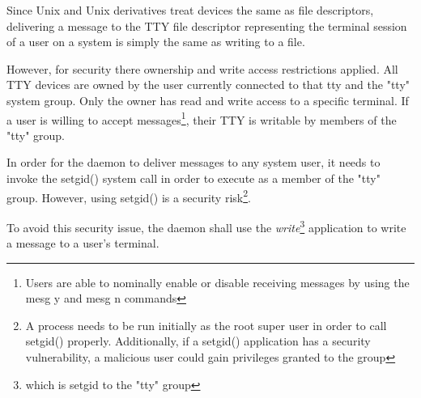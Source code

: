 
Since Unix and Unix derivatives treat devices the same as file
descriptors, delivering a message to the TTY file descriptor 
representing the terminal session of a user on a system is simply the 
same as writing to a file.


However, for security there ownership and write access restrictions
applied. All TTY devices are owned by the user currently connected to
that tty and the "tty" system group. Only the owner has read and write
access to a specific terminal. If a user is willing to accept 
messages\footnote{Users are able to nominally enable or disable receiving messages by using the mesg y and mesg n commands},
their TTY is writable by members of the "tty" group.


In order for the daemon to deliver messages to any system user, it needs
to invoke the setgid() system call in order to execute as a member of 
the "tty" group. However, using setgid() is a security 
risk\footnote{A process needs to be run initially as the root super user in order to call setgid() properly. Additionally, if a setgid() application has a security vulnerability, a malicious user could gain privileges granted to the group}.


To avoid this security issue, the daemon shall use the 
\emph{write}\footnote{which is setgid to the "tty" group} application
to write a message to a user's terminal.
